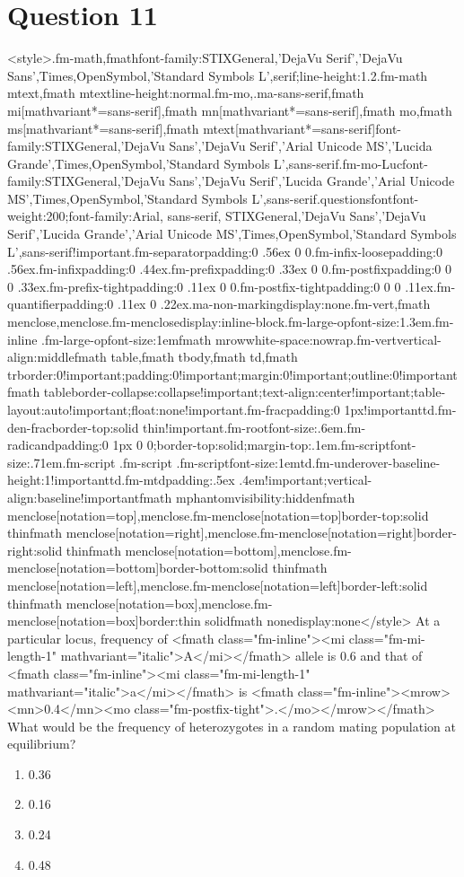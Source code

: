 \documentclass{article}
\begin{document}
\section*{Question 11}
<style>.fm-math,fmath{font-family:STIXGeneral,'DejaVu Serif','DejaVu Sans',Times,OpenSymbol,'Standard Symbols L',serif;line-height:1.2}.fm-math mtext,fmath mtext{line-height:normal}.fm-mo,.ma-sans-serif,fmath mi[mathvariant*=sans-serif],fmath mn[mathvariant*=sans-serif],fmath mo,fmath ms[mathvariant*=sans-serif],fmath mtext[mathvariant*=sans-serif]{font-family:STIXGeneral,'DejaVu Sans','DejaVu Serif','Arial Unicode MS','Lucida Grande',Times,OpenSymbol,'Standard Symbols L',sans-serif}.fm-mo-Luc{font-family:STIXGeneral,'DejaVu Sans','DejaVu Serif','Lucida Grande','Arial Unicode MS',Times,OpenSymbol,'Standard Symbols L',sans-serif}.questionsfont{font-weight:200;font-family:Arial, sans-serif, STIXGeneral,'DejaVu Sans','DejaVu Serif','Lucida Grande','Arial Unicode MS',Times,OpenSymbol,'Standard Symbols L',sans-serif!important}.fm-separator{padding:0 .56ex 0 0}.fm-infix-loose{padding:0 .56ex}.fm-infix{padding:0 .44ex}.fm-prefix{padding:0 .33ex 0 0}.fm-postfix{padding:0 0 0 .33ex}.fm-prefix-tight{padding:0 .11ex 0 0}.fm-postfix-tight{padding:0 0 0 .11ex}.fm-quantifier{padding:0 .11ex 0 .22ex}.ma-non-marking{display:none}.fm-vert,fmath menclose,menclose.fm-menclose{display:inline-block}.fm-large-op{font-size:1.3em}.fm-inline .fm-large-op{font-size:1em}fmath mrow{white-space:nowrap}.fm-vert{vertical-align:middle}fmath table,fmath tbody,fmath td,fmath tr{border:0!important;padding:0!important;margin:0!important;outline:0!important}fmath table{border-collapse:collapse!important;text-align:center!important;table-layout:auto!important;float:none!important}.fm-frac{padding:0 1px!important}td.fm-den-frac{border-top:solid thin!important}.fm-root{font-size:.6em}.fm-radicand{padding:0 1px 0 0;border-top:solid;margin-top:.1em}.fm-script{font-size:.71em}.fm-script .fm-script .fm-script{font-size:1em}td.fm-underover-base{line-height:1!important}td.fm-mtd{padding:.5ex .4em!important;vertical-align:baseline!important}fmath mphantom{visibility:hidden}fmath menclose[notation=top],menclose.fm-menclose[notation=top]{border-top:solid thin}fmath menclose[notation=right],menclose.fm-menclose[notation=right]{border-right:solid thin}fmath menclose[notation=bottom],menclose.fm-menclose[notation=bottom]{border-bottom:solid thin}fmath menclose[notation=left],menclose.fm-menclose[notation=left]{border-left:solid thin}fmath menclose[notation=box],menclose.fm-menclose[notation=box]{border:thin solid}fmath none{display:none}</style> At a particular locus, frequency of <fmath class="fm-inline"><mi class="fm-mi-length-1" mathvariant="italic">A</mi></fmath> allele is 0.6 and that of <fmath class="fm-inline"><mi class="fm-mi-length-1" mathvariant="italic">a</mi></fmath> is <fmath class="fm-inline"><mrow><mn>0.4</mn><mo class="fm-postfix-tight">.</mo></mrow></fmath> What would be the frequency of heterozygotes in a random mating population at equilibrium? 
\begin{enumerate}[label=(\alph*)]
\item  0.36
\item  0.16
\item  0.24 
\item  0.48
\end{enumerate}
\newpage
\end{document}
